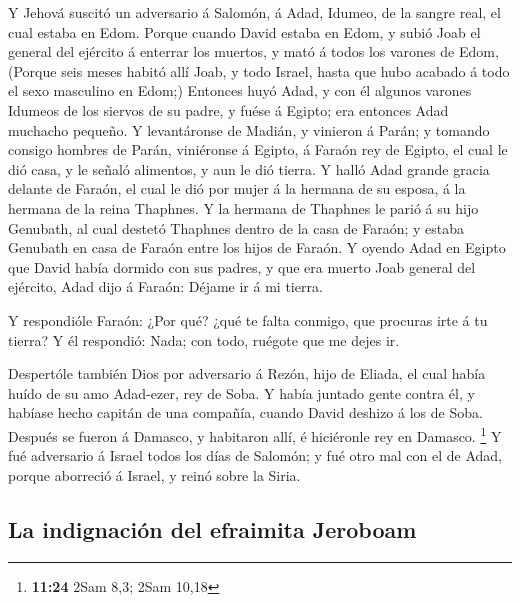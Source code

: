  Y Jehová suscitó un adversario á Salomón, á Adad, Idumeo,
de la sangre real, el cual estaba en Edom.  Porque cuando
David estaba en Edom, y subió Joab el general del ejército á enterrar
los muertos, y mató á todos los varones de Edom,  (Porque
seis meses habitó allí Joab, y todo Israel, hasta que hubo acabado á
todo el sexo masculino en Edom;)  Entonces huyó Adad, y con
él algunos varones Idumeos de los siervos de su padre, y fuése á Egipto;
era entonces Adad muchacho pequeño.  Y levantáronse de
Madián, y vinieron á Parán; y tomando consigo hombres de Parán,
viniéronse á Egipto, á Faraón rey de Egipto, el cual le dió casa, y le
señaló alimentos, y aun le dió tierra.  Y halló Adad grande
gracia delante de Faraón, el cual le dió por mujer á la hermana de su
esposa, á la hermana de la reina Thaphnes.  Y la hermana de
Thaphnes le parió á su hijo Genubath, al cual destetó Thaphnes dentro de
la casa de Faraón; y estaba Genubath en casa de Faraón entre los hijos
de Faraón.  Y oyendo Adad en Egipto que David había dormido
con sus padres, y que era muerto Joab general del ejército, Adad dijo á
Faraón: Déjame ir á mi tierra.

 Y respondióle Faraón: ¿Por qué? ¿qué te falta conmigo, que
procuras irte á tu tierra? Y él respondió: Nada; con todo, ruégote que
me dejes ir.

 Despertóle también Dios por adversario á Rezón, hijo de
Eliada, el cual había huído de su amo Adad-ezer, rey de Soba.
 Y había juntado gente contra él, y habíase hecho capitán
de una compañía, cuando David deshizo á los de Soba. Después se fueron á
Damasco, y habitaron allí, é hiciéronle rey en Damasco. \footnote{\textbf{11:24}
  2Sam 8,3; 2Sam 10,18}  Y fué adversario á Israel todos
los días de Salomón; y fué otro mal con el de Adad, porque aborreció á
Israel, y reinó sobre la Siria.

\hypertarget{la-indignaciuxf3n-del-efraimita-jeroboam}{%
\subsection{La indignación del efraimita
Jeroboam}\label{la-indignaciuxf3n-del-efraimita-jeroboam}}


